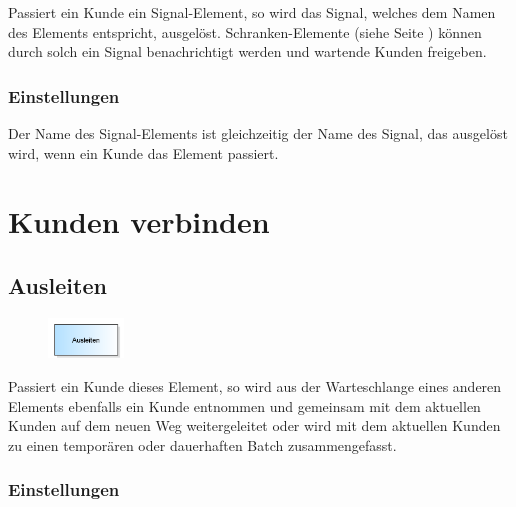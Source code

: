Passiert ein Kunde ein Signal-Element, so wird das Signal, welches dem Namen des Elements entspricht, ausgelöst.
Schranken-Elemente (siehe Seite \pageref{ref:ModelElementBarrier}) können durch solch ein Signal benachrichtigt werden und
wartende Kunden freigeben.

\subsection*{Einstellungen}

Der Name des Signal-Elements ist gleichzeitig der Name des Signal, das ausgelöst wird, wenn ein Kunde das Element passiert.





\chapter{Kunden verbinden}

\section{Ausleiten}
\label{ref:ModelElementPickUp}

\begin{figure}
\vspace{-22pt}
\includegraphics[width=2cm]{imageModelElementPickUp.png}
\vspace{-22pt}
\end{figure}

Passiert ein Kunde dieses Element, so wird aus der Warteschlange eines anderen Elements ebenfalls ein Kunde entnommen
und gemeinsam mit dem aktuellen Kunden auf dem neuen Weg weitergeleitet oder wird mit dem aktuellen Kunden
zu einen temporären oder dauerhaften Batch zusammengefasst.

\subsection*{Einstellungen}

